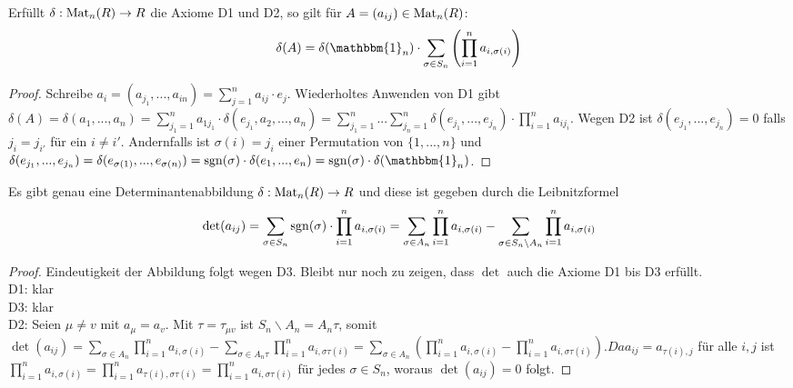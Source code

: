 \begin{lemma}
	Erfüllt $\delta:\operatorname{Mat}_n(R)\to R$ die Axiome D1 und D2, so gilt für $A=(a_{ij})\in \operatorname{Mat}_n(R)$: 
	\begin{align}
		\delta(A)=\delta(\mathbbm{1}_n)
		\cdot \sum_{\sigma\in S_n} \left( \prod_{i=1}^n a_{i,\sigma(i)} \right)\notag
	\end{align}
\end{lemma}
\begin{proof}
	Schreibe $a_i=(a_{j_1},...,a_{in})=\sum_{j=1}^n a_{ij}\cdot e_j$. Wiederholtes Anwenden von D1 gibt $\delta(A)=\delta(
	a_1,...,a_n)=\sum_{j_1=1}^n a_{1j_1}\cdot \delta(e_{j_1},a_2,...,a_n)=\sum_{j_1=1}^n ... \sum_{j_n=1}^n \delta(
	e_{j_1},...,e_{j_n})\cdot \prod_{i=1}^n a_{ij_i}$. Wegen D2 ist $\delta(e_{j_1},...,e_{j_n})=0$ falls $j_i=j_{i'}$ für ein $i\neq i'$. 
	Andernfalls ist $\sigma(i)=j_i$ einer Permutation von $\{1,...,n\}$ und $\delta(e_{j_1},...,e_{j_n})=\delta(e_{\sigma(1)},...,e_{\sigma(n)})=
	\sgn(\sigma)\cdot \delta(e_1,...,e_n)=\sgn(\sigma)\cdot \delta(\mathbbm{1}_n)$.
\end{proof}

\begin{theorem}
	Es gibt genau eine Determinantenabbildung $\delta:\operatorname{Mat}_n(R)\to R$ und diese ist gegeben durch die 
	Leibnitzformel 
	\begin{align}
		\det(a_{ij})=\sum_{\sigma\in S_n} \operatorname{sgn}(\sigma)\cdot \prod_{i=1}^n a_{i,\sigma(i)} = \sum_{\sigma
			\in A_n}\prod_{i=1}^n a_{i,\sigma(i)} - \sum_{\sigma\in S_n\backslash A_n}\prod_{i=1}^n a_{i,\sigma(i)}\notag
	\end{align}
\end{theorem}
\begin{proof}
	Eindeutigkeit der Abbildung folgt wegen D3. Bleibt nur noch zu zeigen, dass $\det$ auch die Axiome D1 bis D3 erfüllt. \\
	D1: klar \\
	D3: klar \\
	D2: Seien $\mu\neq v$ mit $a_{\mu}=a_v$. Mit $\tau=\tau_{\mu v}$ ist $S_n\backslash A_n = A_n\tau$, somit $\det(a_{ij})=
	\sum_{\sigma\in A_n} \prod_{i=1}^n a_{i,\sigma(i)}-\sum_{\sigma\in A_n\tau} \prod_{i=1}^n a_{i,\sigma\tau(i)}=
	\sum_{\sigma\in A_n} \left( \prod_{i=1}^n a_{i,\sigma(i)} - \prod_{i=1}^n a_{i,\sigma\tau(i)} \right). Da a_{ij}=a_{\tau(i),j}$ 
	für alle $i,j$ ist $\prod_{i=1}^n a_{i,\sigma(i)}=\prod_{i=1}^n a_{\tau(i),\sigma\tau(i)}=\prod_{i=1}^n a_{i,\sigma\tau(i)}$ 
	für jedes $\sigma\in S_n$, woraus $\det(a_{ij})=0$ folgt.
\end{proof}

